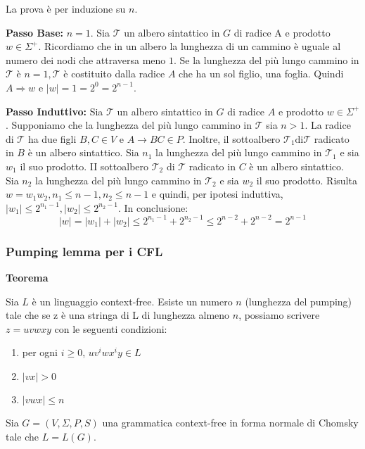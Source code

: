 La prova è per induzione su $n$.

\vspace{5mm}

\textbf{Passo Base:} $n=1$. Sia $\mathcal{T}$ un albero sintattico in $G$ di radice A e prodotto $w \in \Sigma^{+}$.
Ricordiamo che in un albero la lunghezza di un cammino è uguale al numero dei nodi che attraversa meno $1 .$
Se la lunghezza del più lungo cammino in $\mathcal{T}$ è $n=1, \mathcal{T}$ è costituito dalla radice $A$ che ha un sol figlio, una foglia.
Quindi $A \Rightarrow w$ e $|w|=1=2^{0}=2^{n-1}$.

\vspace{5mm}

\textbf{Passo Induttivo:} Sia $\mathcal{T}$ un albero sintattico in $G$ di radice $A$ e prodotto $w \in \Sigma^{+}$. Supponiamo che la lunghezza del più lungo cammino in $\mathcal{T}$ sia $n>1$.
La radice di $\mathcal{T}$ ha due figli $B, C \in V$ e $A \rightarrow B C \in P .$
Inoltre, il sottoalbero $\mathcal{T}_{1} \mathrm{di} \mathcal{T}$ radicato in $B$ è un albero sintattico. Sia $n_{1}$ la lunghezza del più lungo cammino in $\mathcal{T}_{1}$ e sia $w_{1}$ il suo prodotto.
II sottoalbero $\mathcal{T}_{2}$ di $\mathcal{T}$ radicato in $C$ è un albero sintattico. Sia $n_{2}$ la lunghezza del più lungo cammino in $\mathcal{T}_{2}$ e sia $w_{2}$ il suo prodotto.
Risulta $w=w_{1} w_{2}, n_{1} \leq n-1, n_{2} \leq n-1$ e quindi, per ipotesi induttiva, $\left|w_{1}\right| \leq 2^{n_{1}-1},\left|w_{2}\right| \leq 2^{n_{2}-1}$.
In conclusione:
$$
|w|=\left|w_{1}\right|+\left|w_{2}\right| \leq 2^{n_{1}-1}+2^{n_{2}-1} \leq 2^{n-2}+2^{n-2}=2^{n-1}
$$

\subsubsection{Pumping lemma per i CFL}

\textbf{Teorema}

Sia $L$ è un linguaggio context-free. Esiste un numero $n$ (lunghezza del pumping) tale che se z è una stringa di L di lunghezza almeno $n$, possiamo scrivere $z=u v w x y$ con le seguenti condizioni:
\begin{enumerate}
    \item per ogni $i \geq 0$, $u v^{i} w x^{i} y \in L$
    \item $|v x|>0$
    \item  $|v w x| \leq n$
\end{enumerate}

Sia $G=(V, \Sigma, P, S)$ una grammatica context-free in forma normale di Chomsky tale che $L=L(G)$.

